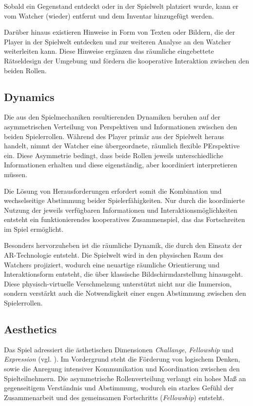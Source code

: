 Sobald ein Gegenstand entdeckt oder in der Spielwelt platziert wurde, kann er vom Watcher (wieder) entfernt und dem Inventar hinzugefügt werden.

Darüber hinaus existieren Hinweise in Form von Texten oder Bildern, die der Player in der Spielwelt entdecken und zur weiteren Analyse an den Watcher weiterleiten kann. Diese Hinweise ergänzen das räumliche eingebettete Rätseldesign der Umgebung und fördern die kooperative Interaktion zwischen den beiden Rollen.

\subsection{Dynamics}

Die aus den Spielmechaniken resultierenden Dynamiken beruhen auf der asymmetrischen Verteilung von Perspektiven und Informationen zwischen den beiden Spielerrollen. Während des Player primär aus der Spielwelt heraus handelt, nimmt der Watcher eine übergeordnete, räumlich flexible PErspektive ein. Diese Asymmetrie bedingt, dass beide Rollen jeweils unterschiedliche Informationen erhalten und diese eigenständig, aber koordiniert interpretieren müssen.

Die Lösung von Herausforderungen erfordert somit die Kombination und wechselseitige Abstimmung beider Spielerfähigkeiten. Nur durch die koordinierte Nutzung der jeweils verfügbaren Informationen und Interaktionsmöglichkeiten entsteht ein funktionierendes kooperatives Zusammenspiel, das das Fortschreiten im Spiel ermöglicht.

Besonders hervorzuheben ist die räumliche Dynamik, die durch den Einsatz der \ac{AR}-Technologie entsteht. Die Spielwelt wird in den physischen Raum des Watchers projiziert, wodurch eine neuartige räumliche Orientierung und Interaktionsform entsteht, die über klassische Bildschirmdarstellung hinausgeht. Diese physisch-virtuelle Verschmelzung unterstützt nicht nur die Immersion, sondern verstärkt auch die Notwendigkeit einer engen Abstimmung zwischen den Spielerrollen.

\subsection{Aesthetics}

Das Spiel adressiert die ästhetischen Dimensionen \textit{Challange}, \textit{Fellowship} und \textit{Expression} (vgl. \citealp[S. 3]{hunicke_mda_2004}). Im Vordergrund steht die Förderung von logischem Denken, sowie die Anregung intensiver Kommunikation und Koordination zwischen den Spielteilnehmern. Die asymmetrische Rollenverteilung verlangt ein hohes Maß an gegenseitigem Verständnis und Abstimmung, wodurch ein starkes Gefühl der Zusammenarbeit und des gemeinsamen Fortschritts (\textit{Fellowship}) entsteht.

